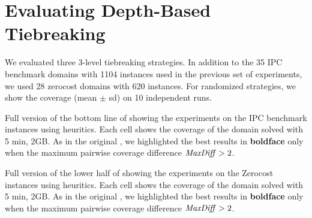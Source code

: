 % 
% 
% 
% 
% 

% 


\section{Evaluating Depth-Based Tiebreaking}
\label{sec:depth-based-evaluation}
We evaluated three 3-level tiebreaking strategies.
% 
In addition to the 35 IPC benchmark domains with 1104 instances used in
the previous set of experiments, we used 28 zerocost domains with 620
instances. For randomized strategies, we
show the coverage (mean $\pm$ sd) on
10 independent runs.




\begin{table}[htb]
 {
 \centering
 
 \caption{
 Full version of the bottom line of  showing 
 the experiments on the IPC benchmark instances using \mands heuritics.
 Each cell shows the coverage of the domain solved with 5 min, 2GB.
 As in the original , we highlighted the best results in
 \textbf{boldface} only when the maximum pairwise coverage difference $\mit{MaxDiff}>2$.
 }
 \label{mands-zerocost-full}
 }
\end{table}

\begin{table}[htb]
 {
 \centering
 
 \caption{
 Full version of the lower half of  showing 
 the experiments on the Zerocost instances using \lmcut heuritics.
 Each cell shows the coverage of the domain solved with 5 min, 2GB.
 As in the original , we highlighted the best results in
 \textbf{boldface} only when the maximum pairwise coverage difference $\mit{MaxDiff}>2$.
 }
 \label{lmcut-zerocost-full}
 }
\end{table}


